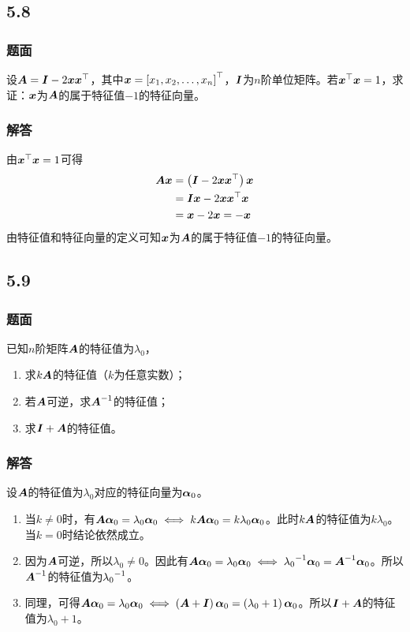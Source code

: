 \documentclass{beamer}
\begin{document}
\subsection*{5.8}
\begin{frame}
    \frametitle{题面}
    设\(\boldsymbol{A}=\boldsymbol{I}-2\boldsymbol{x}\boldsymbol{x}^\top\)，其中\(\boldsymbol{x}=\left[ {x}_1,{x}_2,\dots,{x}_{n} \right]^\top\)，\(\boldsymbol{I}\)为\(n\)阶单位矩阵。若\(\boldsymbol{x}^\top\boldsymbol{x}=1\)，求证：\(\boldsymbol{x}\)为\(\boldsymbol{A}\)的属于特征值\(-1\)的特征向量。
\end{frame}

\begin{frame}
    \frametitle{解答}
    由\(\boldsymbol{x}^\top\boldsymbol{x}=1\)可得
    \begin{align*}
        \boldsymbol{A}\boldsymbol{x} & =\left( \boldsymbol{I}-2\boldsymbol{x}\boldsymbol{x}^\top \right)\boldsymbol{x} \\
                   & =\boldsymbol{I}\boldsymbol{x}-2\boldsymbol{x}\boldsymbol{x}^\top\boldsymbol{x}    \\
                   & =\boldsymbol{x}-2\boldsymbol{x}=-\boldsymbol{x}
    \end{align*}
    \pause
    由特征值和特征向量的定义可知\(\boldsymbol{x}\)为\(\boldsymbol{A}\)的属于特征值\(-1\)的特征向量。
\end{frame}

\subsection*{5.9}
\begin{frame}
    \frametitle{题面}
    已知\(n\)阶矩阵\(\boldsymbol{A}\)的特征值为\(\lambda_0\)，
    \begin{enumerate}
        \item 求\(k\boldsymbol{A}\)的特征值（\(k\)为任意实数）；
        \item 若\(\boldsymbol{A}\)可逆，求\({\boldsymbol{A}}^{-1}\)的特征值；
        \item 求\(\boldsymbol{I}+\boldsymbol{A}\)的特征值。
    \end{enumerate}
\end{frame}

\begin{frame}
    \frametitle{解答}
    设\(\boldsymbol{A}\)的特征值为\(\lambda_0\)对应的特征向量为\(\boldsymbol{\alpha}_0\)。
    \begin{enumerate}
        \item 当\(k\neq0\)时，有\(\boldsymbol{A}\boldsymbol{\alpha}_0=\lambda_0\boldsymbol{\alpha}_0\iff k\boldsymbol{A}\boldsymbol{\alpha}_0=k\lambda_0\boldsymbol{\alpha}_0\)。此时\(k\boldsymbol{A}\)的特征值为\(k\lambda_0\)。当\(k=0\)时结论依然成立。\pause
        \item 因为\(\boldsymbol{A}\)可逆，所以\(\lambda_0\neq0\)。因此有\(\boldsymbol{A}\boldsymbol{\alpha}_0=\lambda_0\boldsymbol{\alpha}_0\iff{\lambda_0}^{-1}\boldsymbol{\alpha}_0={\boldsymbol{A}}^{-1}\boldsymbol{\alpha}_0\)。所以\({\boldsymbol{A}}^{-1}\)的特征值为\({\lambda_0}^{-1}\)。\pause
        \item 同理，可得\(\boldsymbol{A}\boldsymbol{\alpha}_0=\lambda_0\boldsymbol{\alpha}_0\iff\left( \boldsymbol{A}+\boldsymbol{I} \right)\boldsymbol{\alpha}_0=\left( \lambda_0+1 \right)\boldsymbol{\alpha}_0\)。所以\(\boldsymbol{I}+\boldsymbol{A}\)的特征值为\(\lambda_0+1\)。
    \end{enumerate}
\end{frame}
\end{document}
